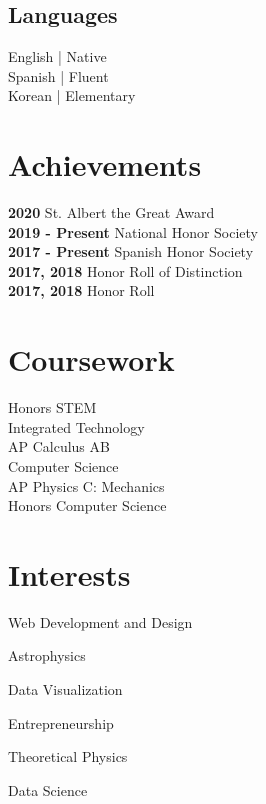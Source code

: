 \documentclass[]{deedy-resume-openfont}
\begin{document}
\begin{minipage}[t]{0.33\textwidth}
\vspace{\topsep}

\subsection{Languages}
English | Native \\
Spanish | Fluent \\
Korean | Elementary \\



\section{Achievements} 
\textbf{2020 } St. Albert the Great Award \\
\textbf{2019 - Present } National Honor Society \\
\textbf{2017 - Present } Spanish Honor Society\\
\textbf{2017, 2018 } Honor Roll of Distinction\\
\textbf{2017, 2018 } Honor Roll



\section{Coursework}
Honors STEM \\
Integrated Technology \\
AP Calculus AB \\
Computer Science \\
AP Physics C: Mechanics \\
Honors Computer Science

\section{Interests}
\vspace{\topsep}
\begin{tightemize}
\item Web Development and Design
\item Astrophysics 
\item Data Visualization
\item Entrepreneurship
\item Theoretical Physics
\item Data Science
\end{tightemize}



\end{minipage}
\end{document}
